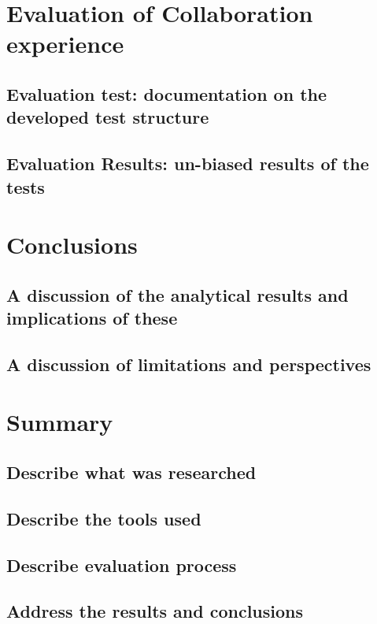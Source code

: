 \chapter{Evaluation of Collaboration experience}
\section{Evaluation test: documentation on the developed test structure}

\section{Evaluation Results: un-biased results of the tests}


\chapter{Conclusions}
\section{A discussion of the analytical results and implications of these}

\section{A discussion of limitations and perspectives}


\chapter{Summary}
\section{Describe what was researched}

\section{Describe the tools used}

\section{Describe evaluation process}

\section{Address the results and conclusions}


